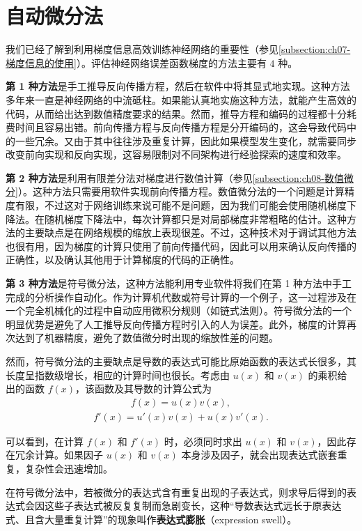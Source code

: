 \documentclass[../../main.tex]{subfiles}
\begin{document}
\section{自动微分法}\label{section:ch08-自动微分法}

我们已经了解到利用梯度信息高效训练神经网络的重要性（参见\cref{subsection:ch07-梯度信息的使用}）。评估神经网络误差函数梯度的方法主要有 $4$ 种。

\textbf{第 1 种方法}是手工推导反向传播方程，然后在软件中将其显式地实现。这种方法多年来一直是神经网络的中流砥柱。如果能认真地实施这种方法，就能产生高效的代码，从而给出达到数值精度要求的结果。然而，推导方程和编码的过程都十分耗费时间且容易出错。前向传播方程与反向传播方程是分开编码的，这会导致代码中的一些冗余。又由于其中往往涉及重复计算，因此如果模型发生变化，就需要同步改变前向实现和反向实现，这容易限制对不同架构进行经验探索的速度和效率。

\textbf{第 2 种方法}是利用有限差分法对梯度进行数值计算（参见\cref{subsection:ch08-数值微分}）。这种方法只需要用软件实现前向传播方程。数值微分法的一个问题是计算精度有限，不过这对于网络训练来说可能不是问题，因为我们可能会使用随机梯度下降法。在随机梯度下降法中，每次计算都只是对局部梯度非常粗略的估计。这种方法的主要缺点是在网络规模的缩放上表现很差。不过，这种技术对于调试其他方法也很有用，因为梯度的计算只使用了前向传播代码，因此可以用来确认反向传播的正确性，以及确认其他用于计算梯度的代码的正确性。

\textbf{第 3 种方法}是符号微分法，这种方法能利用专业软件将我们在第 1 种方法中手工完成的分析操作自动化。作为计算机代数或符号计算的一个例子，这一过程涉及在一个完全机械化的过程中自动应用微积分规则（如链式法则）。符号微分法的一个明显优势是避免了人工推导反向传播方程时引入的人为误差。此外，梯度的计算再次达到了机器精度，避免了数值微分时出现的缩放性差的问题。

然而，符号微分法的主要缺点是导数的表达式可能比原始函数的表达式长很多，其长度呈指数级增长，相应的计算时间也很长。考虑由 $u(x)$ 和 $v(x)$ 的乘积给出的函数 $f(x)$，该函数及其导数的计算公式为
\begin{align}
f(x)=u(x)v(x),
\label{align:ch08-乘积}
\end{align}
\begin{align}
f'(x)=u'(x)v(x)+u(x)v'(x).
\label{align:ch08-乘积导数}
\end{align}

可以看到，在计算 $f(x)$ 和 $f'(x)$ 时，必须同时求出 $u(x)$ 和 $v(x)$，因此存在冗余计算。如果因子 $u(x)$ 和 $v(x)$ 本身涉及因子，就会出现表达式嵌套重复，复杂性会迅速增加。

\begin{definition}[表达式膨胀]\label{definition:ch08-表达式膨胀}
在符号微分法中，若被微分的表达式含有重复出现的子表达式，则求导后得到的表达式会因这些子表达式被反复复制而急剧变长，这种“导数表达式远长于原表达式、且含大量重复计算”的现象叫作\textbf{表达式膨胀}（expression swell）。
\end{definition}
\end{document}
